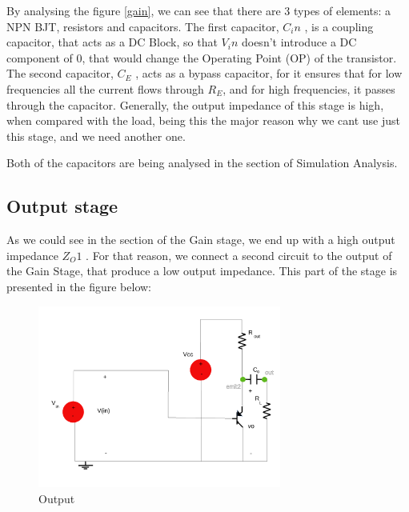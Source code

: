 By analysing the figure \ref{gain}, we can see that there are 3 types of elements: a NPN BJT, resistors and capacitors.
The first capacitor, $C_in$ , is a coupling capacitor, that acts as a DC Block, so that $V_in$ doesn’t
introduce a DC component of 0, that would change the Operating Point (OP) of the transistor.
The second capacitor, $C _E$ , acts as a bypass capacitor, for it ensures that for low frequencies
all the current flows through $R_E$, and for high frequencies, it passes through the capacitor.
Generally, the output impedance of this stage is high, when compared with the load,
being this the major reason why we cant use just this stage, and we need another one. \par
Both of the capacitors are being analysed in the section of Simulation Analysis.

\subsection{Output stage}

As we could see in the section of the Gain stage, we end up with a high output impedance $Z_O1$ . For that reason, we
connect a second circuit to the output of the Gain Stage, that produce a low output impedance.
This part of the stage is presented in the figure below:

\begin{figure}[H] 
\centering
\includegraphics[width = 8cm]{lab4outputstage.pdf} 
\caption{Output}
\label{output}
\end{figure}


